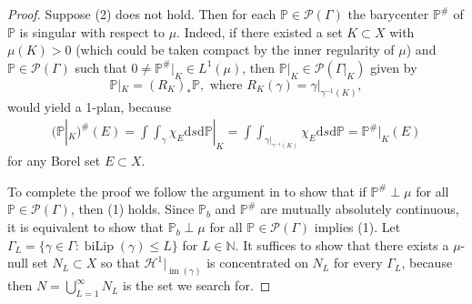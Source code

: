 \documentclass{amsart}
\numberwithin{equation}{section}
\renewcommand{\P}{\mathbb{P}}
\newcommand{\N}{\mathbb{N}}
\newcommand{\Ha}{\mathcal{H}}
\newcommand{\biLip}{\operatorname{biLip}}
\newcommand{\im}{\operatorname{im}}
\newcommand{\ud}{\mathrm {d}}
\begin{document}
\begin{proof}
    Suppose (2) does not hold. Then for each $\P\in\mathcal P(\Gamma)$ the barycenter $\P^\#$ of $\P$ is singular with respect to $\mu$.  
    Indeed, if there existed a set $K\subset X$ with $\mu(K)>0$ (which could be taken compact by the inner regularity of $\mu$) and $\P\in\mathcal P(\Gamma)$ such that $0\ne \P^\#|_K\in L^1(\mu)$, then $\P|_K\in\mathcal P(\Gamma|_K)$ given by
    \[
    \P|_K=(R_K)_\ast \P,\text{ where } R_K(\gamma)=\gamma|_{\gamma^{-1}(K)},
    \]  
would yield a 1-plan, because
\begin{align*}
(\P|_K)^\#(E)=\int\int_\gamma\chi_E\ud s\ud\P|_K=\int\int_{\gamma|_{\gamma^{-1}(K)}}\chi_E \ud s\ud\P=\P^\#|_K(E)
\end{align*}
for any Borel set $E\subset X$.

To complete the proof we follow the argument in \cite[Lemma 9.4.3]{rud} to show that if $\P^\#\perp\mu$ for all $\P\in\mathcal P(\Gamma)$, then (1) holds. Since $\P_b$ and $\P^\#$ are mutually absolutely continuous, it is equivalent to show that $\P_b\perp\mu$ for all $\P\in\mathcal P(\Gamma)$ implies (1).  Let $\Gamma_L=\{\gamma\in\Gamma:\biLip(\gamma)\le L\}$ for $L\in \N$. It suffices to show that there exists a $\mu$-null set $N_L\subset X$ so that $\Ha^1|_{\im(\gamma)}$ is concentrated on $N_L$ for every $\Gamma_L$, because then $N=\bigcup_{L=1}^\infty N_L$ is the set we search for. 


\end{proof}
\end{document}
